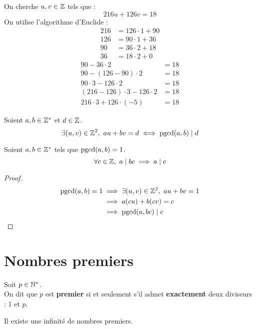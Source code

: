 \begin{example}
	On cherche $u, v \in \mathbb{Z}$ tels que :
	\[ 216u + 126v = 18 \]
	On utilise l'algorithme d'Euclide :
	\begin{align*}
		216 &= 126 \cdot 1 + 90 \\
		126 &= 90 \cdot 1 + 36 \\
		90  &= 36 \cdot 2 + 18 \\
		36  &= 18 \cdot 2 + 0
	\end{align*}
	\begin{align*}
		90 - 36 \cdot 2 &= 18 \\
		90 - (126 - 90) \cdot 2 &= 18 \\
		90 \cdot 3 - 126 \cdot 2 &= 18 \\
		(216 - 126) \cdot 3 - 126 \cdot 2 &= 18 \\
		216 \cdot 3 + 126 \cdot (-5) &= 18
	\end{align*}
\end{example}

\begin{corollary}
	Soient $a, b \in \mathbb{Z}^*$ et $d \in \mathbb{Z}$.
	\[ \exists (u, v) \in \mathbb{Z}^2,\ au + bv = d \iff \operatorname{pgcd}(a,b) \mid d \]
\end{corollary}

\begin{lemma}
	Soient $a, b \in \mathbb{Z}^*$ tels que $\operatorname{pgcd}(a, b) = 1$.
	\[ \forall c \in \mathbb{Z},\ a \mid bc \implies a \mid c \]
\end{lemma}

\begin{proof}
	\begin{align*}
		\operatorname{pgcd}(a, b) = 1 &\implies \exists(u, v) \in \mathbb{Z}^2,\ au + bv = 1 \\
		&\implies a(cu) + b(cv) = c \\ 
		&\implies \operatorname{pgcd}(a, bc) \mid c
	\end{align*}
\end{proof}

\section{Nombres premiers}
\begin{definition}
	Soit $p \in \mathbb{N}^*$. 
	\\
	On dit que $p$ est \textbf{premier} si et seulement s'il admet \textbf{exactement} deux diviseurs : $1$ et $p$.
\end{definition}

\begin{theorem}
	Il existe une infinité de nombres premiers.
\end{theorem}

